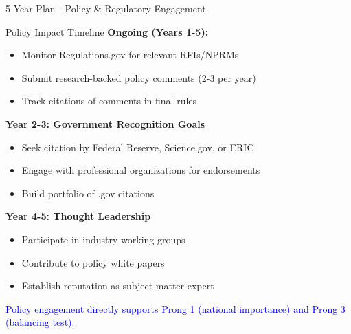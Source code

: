 \documentclass[11pt]{beamer}
\begin{document}
	\begin{frame}{5-Year Plan - Policy \& Regulatory Engagement}
		\scriptsize
		\begin{block}{Policy Impact Timeline}
			\textbf{Ongoing (Years 1-5):}
			\begin{itemize}
				\item Monitor Regulations.gov for relevant RFIs/NPRMs
				\item Submit research-backed policy comments (2-3 per year)
				\item Track citations of comments in final rules
			\end{itemize}
			\textbf{Year 2-3: Government Recognition Goals}
			\begin{itemize}
				\item Seek citation by Federal Reserve, Science.gov, or ERIC
				\item Engage with professional organizations for endorsements
				\item Build portfolio of .gov citations
			\end{itemize}
			\textbf{Year 4-5: Thought Leadership}
			\begin{itemize}
				\item Participate in industry working groups
				\item Contribute to policy white papers
				\item Establish reputation as subject matter expert
			\end{itemize}
			\textcolor{blue}{Policy engagement directly supports Prong 1 (national importance) and Prong 3 (balancing test).}
		\end{block}
	\end{frame}
	
\end{document}
